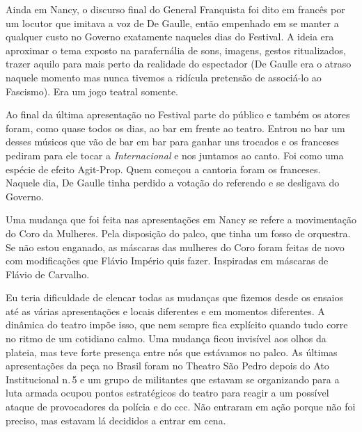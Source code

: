 Ainda em Nancy, o discurso final do General Franquista foi dito em
francês por um locutor que imitava a voz de De Gaulle, então empenhado
em se manter a qualquer custo no Governo exatamente naqueles dias do
Festival. A ideia era aproximar o tema exposto na parafernália de sons,
imagens, gestos ritualizados, trazer aquilo para mais perto da realidade
do espectador (De Gaulle era o atraso naquele momento mas nunca tivemos
a ridícula pretensão de associá-lo ao Fascismo). Era um jogo teatral
somente.

Ao final da última apresentação no Festival parte do público e também os
atores foram, como quase todos os dias, ao bar em frente ao teatro.
Entrou no bar um desses músicos que vão de bar em bar para ganhar uns
trocados e os franceses pediram para ele tocar a {\it Internacional} e
nos juntamos ao canto. Foi como uma espécie de efeito Agit-Prop. Quem
começou a cantoria foram os franceses. Naquele dia, De Gaulle tinha
perdido a votação do referendo e se desligava do Governo.

Uma mudança que foi feita nas apresentações em Nancy se refere a
movimentação do Coro da Mulheres. Pela disposição do palco, que tinha um
fosso de orquestra. Se não estou enganado, as máscaras das mulheres do
Coro foram feitas de novo com modificações que Flávio Império quis
fazer. Inspiradas em máscaras de Flávio de Carvalho.

Eu teria dificuldade de elencar todas as mudanças que fizemos desde os
ensaios até as várias apresentações e locais diferentes e em momentos
diferentes. A dinâmica do teatro impõe isso, que nem sempre fica
explícito quando tudo corre no ritmo de um cotidiano calmo. Uma mudança
ficou invisível aos olhos da plateia, mas teve forte presença entre nós
que estávamos no palco. As últimas apresentações da peça no Brasil foram
no Theatro São Pedro depois do Ato Institucional n.\,5 e um grupo de
militantes que estavam se organizando para a luta armada ocupou pontos
estratégicos do teatro para reagir a um possível ataque de provocadores
da polícia e do {\sc ccc}. Não entraram em ação porque não foi preciso, mas
estavam lá decididos a entrar em cena.

